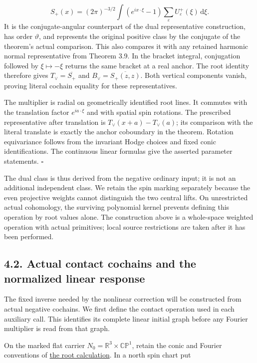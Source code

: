 \documentclass[
  english,
  11pt,
  reqno]{amsart}
\begin{document}
\label{eq:online-positive-tt-anchored-representative} \[
S_+(x)=(2\pi)^{-3/2}\int
(e^{ix\cdot\xi}-1)\sum_\varepsilon U^+_\varepsilon(\xi)
\,\mathrm d\xi .
\] It is the conjugate-angular counterpart of the dual representative
construction, has order \(\vartheta\), and represents the original
positive class by the conjugate of the theorem's actual comparison. This
also compares it with any retained harmonic normal representative from
Theorem 3.9. In the bracket integral, conjugation followed by
\(\xi\mapsto-\xi\) returns the same bracket at a real anchor. The root
identity therefore gives \(T_\vee=\overline{S_+}\) and
\(B_\vee=\overline{S_+(z,z)}\). Both vertical components vanish, proving
literal cochain equality for these representatives.

The multiplier is radial on geometrically identified root lines. It
commutes with the translation factor \(e^{ia\cdot\xi}\) and with spatial
spin rotations. The prescribed representative after translation is
\(T_\vee(x+a)-T_\vee(a)\); its comparison with the literal translate is
exactly the anchor coboundary in the theorem. Rotation equivariance
follows from the invariant Hodge choices and fixed conic
identifications. The continuous linear formulas give the asserted
parameter statements. \hfill\(\square\)

The dual class is thus derived from the negative ordinary input; it is
not an additional independent class. We retain the spin marking
separately because the even projective weights cannot distinguish the
two central lifts. On unrestricted actual cohomology, the surviving
polynomial kernel prevents defining this operation by root values alone.
The construction above is a whole-space weighted operation with actual
primitives; local source restrictions are taken after it has been
performed.

\subsection{4.2. Actual contact cochains and the normalized linear
response}\label{actual-contact-cochains-and-the-normalized-linear-response}\label{sec:online-actual-contact-response}

The fixed inverse needed by the nonlinear correction will be constructed
from actual negative cochains. We first define the contact operation
used in each auxiliary call. This identifies its complete linear initial
graph before any Fourier multiplier is read from that graph.

On the marked flat carrier \(N_0=\mathbb R^3\times\mathbb{CP}^1\),
retain the conic and Fourier conventions of
\hyperref[sec:online-root-complex]{the root calculation}. In a north
spin chart put
\end{document}
